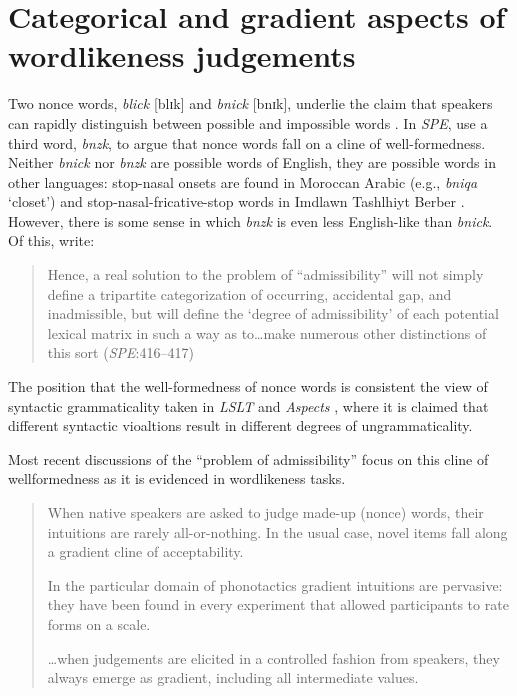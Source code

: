 \chapter{Categorical and gradient aspects of wordlikeness judgements} 
\label{gradience}

Two nonce words, \emph{blick} [blɪk] and \emph{bnick} [bnɪk], underlie the claim that speakers can rapidly distinguish between possible and impossible words \citet{Halle1962}. In \emph{SPE}, \citet{SPE} use a third word, \emph{bnzk}, to argue that nonce words fall on a cline of well-formedness. Neither \emph{bnick} nor \emph{bnzk} are possible words of English, they are possible words in other languages: stop-nasal onsets are found in Moroccan Arabic (e.g., \emph{bniqa} `closet') and stop-nasal-fricative-stop words in Imdlawn Tashlhiyt Berber \citep{Dell1985}. However, there is some sense in which \emph{bnzk} is even less English-like than \emph{bnick}. Of this, \citeauthor{SPE} write:

\begin{quote}
Hence, a real solution to the problem of ``admissibility'' will not simply define a tripartite categorization of occurring, accidental gap, and inadmissible, but will define the `degree of admissibility' of each potential lexical matrix in such a way as to\ldots{}make numerous other distinctions of this sort (\emph{SPE}:416--417)
\end{quote}

\noindent
The position that the well-formedness of nonce words is consistent the view of syntactic grammaticality taken in \emph{LSLT} and \emph{Aspects} \citep{LSLT,ASPECTS}, where it is claimed that different syntactic vioaltions result in different degrees of ungrammaticality.

Most recent discussions of the ``problem of admissibility'' focus on this cline of wellformedness as it is evidenced in wordlikeness tasks.

\begin{quote}
When native speakers are asked to judge made-up (nonce) words, their intuitions are rarely all-or-nothing. In the usual case, novel items fall along a gradient cline of acceptability. \citep[][9]{Albright2009a}

In the particular domain of phonotactics gradient intuitions are pervasive: they have been found in every experiment that allowed participants to rate forms on a scale.
\citep[][382]{Hayes2008a}

\ldots{}when judgements are elicited in a controlled fashion from speakers, they always emerge as gradient, including all intermediate values. \citep[371]{Shademan2006} 
\end{quote}

